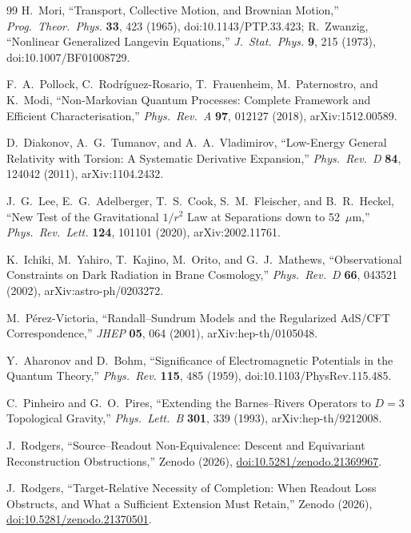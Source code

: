 \documentclass[11pt,a4paper]{article}
\theoremstyle{plain}
\theoremstyle{definition}
\begin{document}
\begin{thebibliography}{99}
H.~Mori,
``Transport, Collective Motion, and Brownian Motion,''
\emph{Prog.\ Theor.\ Phys.} \textbf{33}, 423 (1965),
doi:10.1143/PTP.33.423;
R.~Zwanzig,
``Nonlinear Generalized Langevin Equations,''
\emph{J.\ Stat.\ Phys.} \textbf{9}, 215 (1973),
doi:10.1007/BF01008729.

F.~A.~Pollock, C.~Rodr\'iguez-Rosario, T.~Frauenheim, M.~Paternostro,
and K.~Modi,
``Non-Markovian Quantum Processes: Complete Framework and Efficient
Characterisation,''
\emph{Phys.\ Rev.\ A} \textbf{97}, 012127 (2018),
arXiv:1512.00589.

D.~Diakonov, A.~G.~Tumanov, and A.~A.~Vladimirov,
``Low-Energy General Relativity with Torsion: A Systematic Derivative
Expansion,''
\emph{Phys.\ Rev.\ D} \textbf{84}, 124042 (2011),
arXiv:1104.2432.

J.~G.~Lee, E.~G.~Adelberger, T.~S.~Cook, S.~M.~Fleischer, and
B.~R.~Heckel,
``New Test of the Gravitational $1/r^2$ Law at Separations down to
52~$\mu$m,''
\emph{Phys.\ Rev.\ Lett.} \textbf{124}, 101101 (2020),
arXiv:2002.11761.

K.~Ichiki, M.~Yahiro, T.~Kajino, M.~Orito, and G.~J.~Mathews,
``Observational Constraints on Dark Radiation in Brane Cosmology,''
\emph{Phys.\ Rev.\ D} \textbf{66}, 043521 (2002),
arXiv:astro-ph/0203272.

M.~P\'erez-Victoria,
``Randall--Sundrum Models and the Regularized AdS/CFT Correspondence,''
\emph{JHEP} \textbf{05}, 064 (2001),
arXiv:hep-th/0105048.

Y.~Aharonov and D.~Bohm,
``Significance of Electromagnetic Potentials in the Quantum Theory,''
\emph{Phys.\ Rev.} \textbf{115}, 485 (1959),
doi:10.1103/PhysRev.115.485.

C.~Pinheiro and G.~O.~Pires,
``Extending the Barnes--Rivers Operators to $D=3$ Topological Gravity,''
\emph{Phys.\ Lett.\ B} \textbf{301}, 339 (1993),
arXiv:hep-th/9212008.

J.~Rodgers,
``Source--Readout Non-Equivalence: Descent and Equivariant Reconstruction Obstructions,''
Zenodo (2026),
\href{https://doi.org/10.5281/zenodo.21369967}{doi:10.5281/zenodo.21369967}.

J.~Rodgers,
``Target-Relative Necessity of Completion: When Readout Loss Obstructs, and What a Sufficient Extension Must Retain,''
Zenodo (2026),
\href{https://doi.org/10.5281/zenodo.21370501}{doi:10.5281/zenodo.21370501}.


\end{thebibliography}
\end{document}
